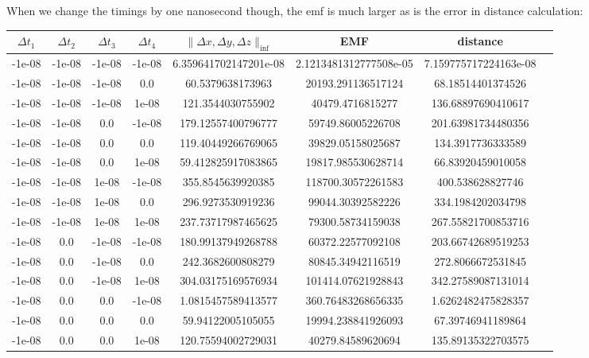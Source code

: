 \documentclass[a4paper]{article}
\begin{document}
When we change the timings by one nanosecond though, the emf is much larger as is the error in distance calculation:

\begin{center}
	\begin{longtable}{@{}c|@{}c|@{}c|@{}c|@{}c|@{}c|@{}cX@{}}
		$\Delta t_1$ & $\Delta t_2$ & $\Delta t_3$ & $\Delta t_4$ & $\| \Delta x, \Delta y, \Delta z \|_{\inf}$ & EMF & distance\\ \hline
        -1e-08 & -1e-08 & -1e-08 & -1e-08 & 6.359641702147201e-08 & 2.1213481312777508e-05 & 7.159775717224163e-08\\ \hline
        -1e-08 & -1e-08 & -1e-08 & 0.0 & 60.5379638173963 & 20193.291136517124 & 68.18514401374526\\ \hline
        -1e-08 & -1e-08 & -1e-08 & 1e-08 & 121.3544030755902 & 40479.4716815277 & 136.68897690410617\\ \hline
        -1e-08 & -1e-08 & 0.0 &-1e-08 & 179.12557400796777 & 59749.86005226708 & 201.63981734480356\\ \hline
        -1e-08 & -1e-08 & 0.0 &0.0 & 119.40449266769065 & 39829.05158025687 & 134.3917736333589\\ \hline
        -1e-08 & -1e-08 & 0.0 &1e-08 & 59.412825917083865 & 19817.985530628714 & 66.83920459010058\\ \hline
        -1e-08 & -1e-08 & 1e-08 & -1e-08 & 355.8545639920385 & 118700.30572261583 & 400.538628827746\\ \hline
        -1e-08 & -1e-08 & 1e-08 & 0.0 & 296.9273530919236 & 99044.30392582226 & 334.1984202034798\\ \hline
        -1e-08 & -1e-08 & 1e-08 & 1e-08 & 237.73717987465625 & 79300.58734159038 & 267.55821700853716\\ \hline
        -1e-08 & 0.0 &-1e-08 & -1e-08 & 180.99137949268788 & 60372.22577092108 & 203.66742689519253\\ \hline
        -1e-08 & 0.0 &-1e-08 & 0.0 & 242.3682600808279 & 80845.34942116519 & 272.8066672531845\\ \hline
        -1e-08 & 0.0 &-1e-08 & 1e-08 & 304.03175169576934 & 101414.07621928843 & 342.27589087131014\\ \hline
        -1e-08 & 0.0 &0.0 &-1e-08 & 1.0815457589413577 & 360.76483268656335 & 1.6262482475828357\\ \hline
        -1e-08 & 0.0 &0.0 &0.0 & 59.94122005105055 & 19994.238841926093 & 67.39746941189864\\ \hline
        -1e-08 & 0.0 &0.0 &1e-08 & 120.75594002729031 & 40279.84589620694 & 135.89135322703575\\ \hline

\end{longtable}
\end{center}
\end{document}
